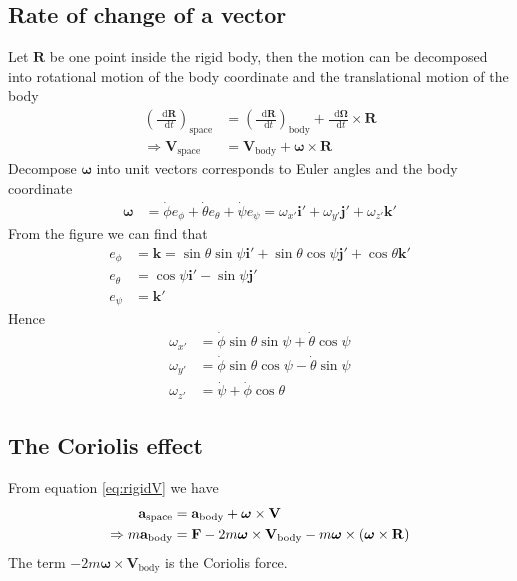 \documentclass[twoside,9pt]{article}
\numberwithin{equation}{section} %
\renewcommand*\d{\mathop{}\!\mathrm{d}}
\theoremstyle{definition}
\theoremstyle{remark}
\begin{document}
\subsection{Rate of change of a vector}
Let $\mathbf{R}$ be one point inside the rigid body, then
the motion can be decomposed into rotational motion of the
body coordinate and the translational motion of the body
\begin{align}
    \left(\frac{\d\mathbf{R}}{\d t}\right)_\text{space}
    &= \left(\frac{\d\mathbf{R}}{\d t}\right)_\text{body}
    + \frac{\d\boldsymbol{\Omega}}{\d t}\times\mathbf{R}\\
    \Rightarrow
    \mathbf{V}_\text{space} &= \mathbf{V}_\text{body}
    + \boldsymbol{\omega}\times\mathbf{R}
    \label{eq:rigidV}
\end{align}
Decompose $\boldsymbol{\omega}$ into unit vectors corresponds
to Euler angles and the body coordinate
\begin{align}
    \boldsymbol{\omega} &= 
    \dot\phi e_\phi + \dot\theta e_\theta + \dot\psi e_\psi
    = \omega_{x'}\mathbf{i}' + \omega_{y'}\mathbf{j}'
    + \omega_{z'}\mathbf{k}'
\end{align}
From the figure we can find that
\begin{align}
    e_\phi &= \mathbf{k}
    = \sin\theta\sin\psi\mathbf{i}' + \sin\theta\cos\psi\mathbf{j}'
    + \cos\theta\mathbf{k}'\\
    e_\theta &= \cos\psi\mathbf{i}' - \sin\psi\mathbf{j}'\\
    e_\psi &= \mathbf{k}'
\end{align}
Hence
\begin{align}
    \omega_{x'} &= \dot\phi\sin\theta\sin\psi + \dot\theta\cos\psi\\
    \omega_{y'} &= \dot\phi\sin\theta\cos\psi - \dot\theta\sin\psi\\
    \omega_{z'} &= \dot\psi + \dot\phi\cos\theta
\end{align}

\subsection{The Coriolis effect}
From equation \ref{eq:rigidV} we have
\begin{align}
    \mathbf{a}_\text{space} &=
    \mathbf{a}_\text{body}  + \boldsymbol{\omega}\times\mathbf{V}_\text{\space}\\
    \Rightarrow
    m\mathbf{a}_\text{body} &= 
    \mathbf{F} - 2m\boldsymbol{\omega}\times\mathbf{V}_\text{body}
    - m\boldsymbol{\omega}\times(\boldsymbol{\omega}\times\mathbf{R})
\end{align}
The term $-2m\boldsymbol{\omega}\times\mathbf{V}_\text{body}$
is the Coriolis force.


\end{document}

